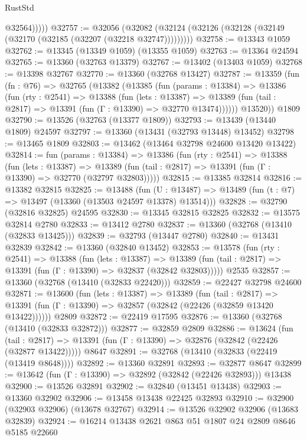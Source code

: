 \begin{lexlean}{RustStd}
\begin{coremodule}
              @32564)))))
@32757 := @32056
    (@32082 (@32124 (@32126 (@32128 (@32149 (@32170 (@32185 (@32207 (@32218 @32747)))))))))
@32758 := @13343 @1059
@32762 := @13345 (@13349 @1059) (@13355 @1059)
@32763 := @13364 @24594
@32765 := @13360 (@32763 @13379)
@32767 := @13402 (@13403 @1059)
@32768 := @13398 @32767
@32770 := @13360 (@32768 @13427)
@32787 := @13359
    (fun (fn : @76) =>
    @32765
      (@13382
        (@13385
          (fun (params : @13384) =>
          @13386
            (fun (rty : @2541) =>
            @13388
              (fun (lets : @13387) =>
              @13389 (fun (tail : @2817) => @13391 (fun (Γ : @13390) => @32770 @13474))))))
        @13520))
    @1809
@32790 := @13526 (@32763 (@13377 @1809))
@32793 := @13439 (@13440 @1809) @24597
@32797 := @13360 (@13431 (@32793 @13448) @13452)
@32798 := @13465 @1809
@32803 := @13462 (@13464 @32798 @24600 @13420 @13422)
@32814 := fun (params : @13384) =>
  @13386
    (fun (rty : @2541) =>
    @13388
      (fun (lets : @13387) =>
      @13389 (fun (tail : @2817) => @13391 (fun (Γ : @13390) => @32770 (@32797 @32803)))))
@32815 := @13385 @32814
@32816 := @13382 @32815
@32825 := @13488
    (fun (U : @13487) => @13489 (fun (t : @7) => @13497 (@13360 (@13503 @24597 @13378) @13514)))
@32828 := @32790 (@32816 @32825) @24595
@32830 := @13345 @32815 @32825
@32832 := @13575 @32814 @2780
@32833 := @13412 @2780
@32837 := @13360 (@32768 (@13410 (@32833 @13425)))
@32839 := @32793 (@13447 @2780)
@32840 := @13431 @32839
@32842 := @13360 (@32840 @13452)
@32853 := @13578
    (fun (rty : @2541) =>
    @13388
      (fun (lets : @13387) =>
      @13389 (fun (tail : @2817) => @13391 (fun (Γ : @13390) => @32837 (@32842 @32803)))))
    @2535
@32857 := @13360 (@32768 (@13410 (@32833 @22420)))
@32859 := @22427 @32798 @24600
@32871 := @13600
    (fun (lets : @13387) =>
    @13389
      (fun (tail : @2817) =>
      @13391 (fun (Γ : @13390) => @32857 (@32842 (@22426 (@32859 @13420 @13422))))))
    @2809
@32872 := @22419 @17595
@32876 := @13360 (@32768 (@13410 (@32833 @32872)))
@32877 := @32859 @2809
@32886 := @13624
    (fun (tail : @2817) => @13391 (fun (Γ : @13390) => @32876 (@32842 (@22426 (@32877 @13422)))))
    @8647
@32891 := @32768 (@13410 (@32833 (@22419 (@13419 @8648))))
@32892 := @13360 @32891
@32893 := @32877 @8647
@32899 := @13642 (fun (Γ : @13390) => @32892 (@32842 (@22426 @32893))) @13438
@32900 := @13526 @32891
@32902 := @32840 (@13451 @13438)
@32903 := @13360 @32902
@32906 := @13458 @13438 @22425 @32893
@32910 := @32900 (@32903 @32906) (@13678 @32767)
@32914 := @13526 @32902 @32906 (@13683 @32839)
@32924 := @16214 @13438 @2621 @863 @51 @1807 @24 @2809 @8646 @5185 @22660

\end{coremodule}
\end{lexlean}
